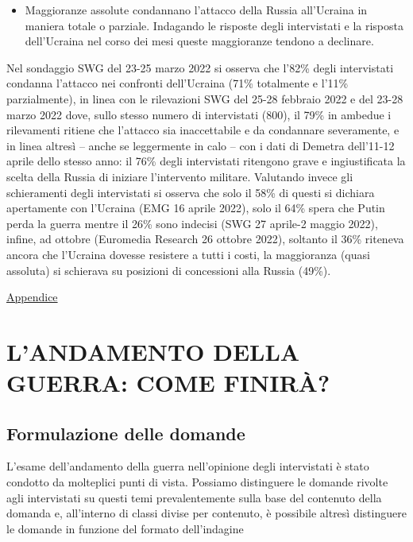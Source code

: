 \documentclass[
  openany]{book}
\providecommand{\tightlist}{%
  \setlength{\itemsep}{0pt}\setlength{\parskip}{0pt}}
\begin{document}
\begin{itemize}
\tightlist
\item
  Maggioranze assolute condannano l'attacco della Russia all'Ucraina in maniera totale o parziale. Indagando le risposte degli intervistati e la risposta dell'Ucraina nel corso dei mesi queste maggioranze tendono a declinare.
\end{itemize}

Nel sondaggio SWG del 23-25 marzo 2022 si osserva che l'82\% degli intervistati condanna l'attacco nei confronti dell'Ucraina (71\% totalmente e l'11\% parzialmente), in linea con le rilevazioni SWG del 25-28 febbraio 2022 e del 23-28 marzo 2022 dove, sullo stesso numero di intervistati (800), il 79\% in ambedue i rilevamenti ritiene che l'attacco sia inaccettabile e da condannare severamente, e in linea altresì -- anche se leggermente in calo -- con i dati di Demetra dell'11-12 aprile dello stesso anno: il 76\% degli intervistati ritengono grave e ingiustificata la scelta della Russia di iniziare l'intervento militare. Valutando invece gli schieramenti degli intervistati si osserva che solo il 58\% di questi si dichiara apertamente con l'Ucraina (EMG 16 aprile 2022), solo il 64\% spera che Putin perda la guerra mentre il 26\% sono indecisi (SWG 27 aprile-2 maggio 2022), infine, ad ottobre (Euromedia Research 26 ottobre 2022), soltanto il 36\% riteneva ancora che l'Ucraina dovesse resistere a tutti i costi, la maggioranza (quasi assoluta) si schierava su posizioni di concessioni alla Russia (49\%).

\href{https://github.com/LucianaFazio/Ucrania/blob/main/PDF_Appendice/III.\%20Le\%20cause\%20della\%20guerra_v.5.pdf}{Appendice}

\hypertarget{landamento-della-guerra-come-finiruxe0}{%
\chapter{L'ANDAMENTO DELLA GUERRA: COME FINIRÀ?}\label{landamento-della-guerra-come-finiruxe0}}

\hypertarget{formulazione-delle-domande-2}{%
\section{Formulazione delle domande}\label{formulazione-delle-domande-2}}

L'esame dell'andamento della guerra nell'opinione degli intervistati è stato condotto da molteplici punti di vista. Possiamo distinguere le domande rivolte agli intervistati su questi temi prevalentemente sulla base del contenuto della domanda e, all'interno di classi divise per contenuto, è possibile altresì distinguere le domande in funzione del formato dell'indagine
\end{document}
